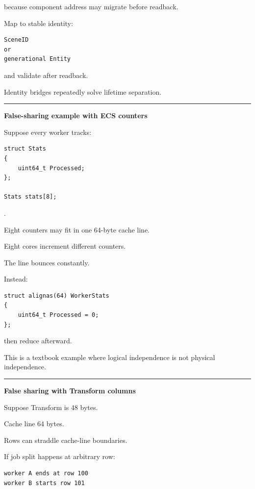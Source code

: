 because component address may migrate before readback.

Map to stable identity:

\begin{verbatim}
SceneID
or
generational Entity
\end{verbatim}

and validate after readback.

Identity bridges repeatedly solve lifetime separation.

\begin{center}\rule{0.5\linewidth}{0.5pt}\end{center}

\textbf{False-sharing example with ECS counters}

Suppose every worker tracks:

\begin{verbatim}
struct Stats
{
    uint64_t Processed;
};

Stats stats[8];
\end{verbatim}

.

Eight counters may fit in one 64-byte cache line.

Eight cores increment different counters.

The line bounces constantly.

Instead:

\begin{verbatim}
struct alignas(64) WorkerStats
{
    uint64_t Processed = 0;
};
\end{verbatim}

then reduce afterward.

This is a textbook example where logical independence is not physical independence.

\begin{center}\rule{0.5\linewidth}{0.5pt}\end{center}

\textbf{False sharing with Transform columns}

Suppose Transform is 48 bytes.

Cache line 64 bytes.

Rows can straddle cache-line boundaries.

If job split happens at arbitrary row:

\begin{verbatim}
worker A ends at row 100
worker B starts row 101
\end{verbatim}

